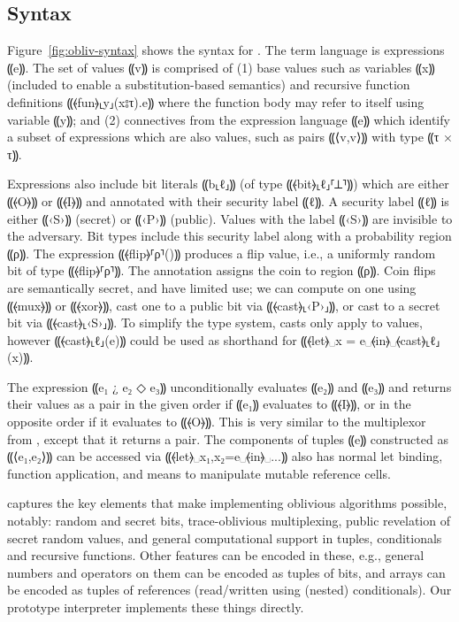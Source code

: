 
\subsection{Syntax}
\label{subsec:obliv-design-syntax}

Figure~\ref{fig:obliv-syntax} shows the syntax for \obliv. The term language is
expressions ⸨e⸩. The set of values ⸨v⸩ is comprised of (1) base values such as
variables ⸨x⸩ (included to enable a substitution-based semantics) and recursive function
definitions ⸨⦑fun⦒⸤y⸥(x{⦂}τ).e⸩ where the function body may refer to itself
using variable ⸨y⸩; and (2) connectives from the expression language ⸨e⸩ which
identify a subset of expressions which are also values, such as pairs ⸨⟨v,v⟩⸩
with type ⸨τ × τ⸩.

Expressions also include bit literals ⸨b⸤ℓ⸥⸩ (of type ⸨⦑bit⦒⸤ℓ⸥⸢⊥⸣⸩) which are
either ⸨⦑O⦒⸩ or ⸨⦑I⦒⸩ and annotated with their security label
⸨ℓ⸩.
%
A security label ⸨ℓ⸩ is either
⸨‹S›⸩ (secret) or ⸨‹P›⸩ (public). Values with the label ⸨‹S›⸩ are invisible to
the adversary. Bit types include this security label along with a probability
region ⸨ρ⸩. The expression ⸨⦑flip⦒⸢ρ⸣()⸩ produces a flip value, i.e.,
a uniformly random bit of type ⸨⦑flip⦒⸢ρ⸣⸩.
The annotation assigns the coin to region ⸨ρ⸩. Coin flips are semantically secret, and have
limited use; we can compute on one using ⸨⦑mux⦒⸩ or ⸨⦑xor⦒⸩, cast one to a
public bit via ⸨⦑cast⦒⸤‹P›⸥⸩, or cast to a secret bit via ⸨⦑cast⦒⸤‹S›⸥⸩. To
simplify the type system, casts only apply to values, however ⸨⦑cast⦒⸤ℓ⸥(e)⸩
could be used as shorthand for ⸨⦑let⦒␣x = e␣⦑in⦒␣⦑cast⦒⸤ℓ⸥(x)⸩.

The expression ⸨e₁ {¿} e₂ {◇} e₃⸩ unconditionally evaluates ⸨e₂⸩ and ⸨e₃⸩ and
returns their values as a pair in the given order if ⸨e₁⸩ evaluates to ⸨⦑I⦒⸩, or in the
opposite order if it evaluates to ⸨⦑O⦒⸩. This is very similar to the multiplexor
from \mpc, except that it returns a pair. The components of tuples
⸨e⸩ constructed as ⸨⟨e₁,e₂⟩⸩ can be accessed via ⸨⦑let⦒␣x₁,x₂=e␣⦑in⦒␣...⸩
\obliv also has normal let binding, function application, and means to manipulate
mutable reference cells.

\obliv captures the key elements that make implementing oblivious
algorithms possible, notably: random and secret bits, trace-oblivious
multiplexing, public revelation of secret random values, and general
computational support in tuples, conditionals and recursive functions.
Other features can be encoded in these, e.g., general numbers and
operators on them can be encoded as tuples of bits, and arrays can be
encoded as tuples of references (read/written using (nested) conditionals).
Our prototype interpreter implements these things directly.

